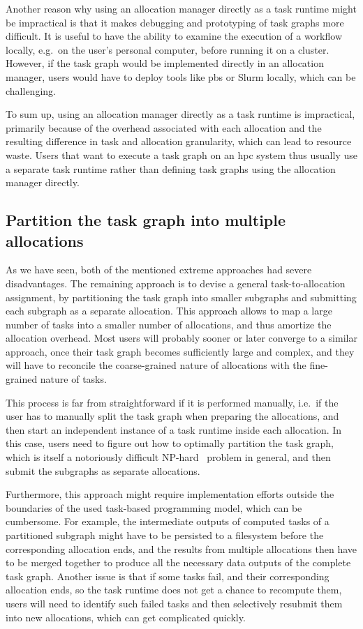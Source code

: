 Another reason why using an allocation manager directly as a task runtime might be impractical is
that it makes debugging and prototyping of task graphs more difficult. It is useful to have the
ability to examine the execution of a workflow locally, e.g.\ on the user's personal computer,
before running it on a cluster. However, if the task graph would be implemented directly in an
allocation manager, users would have to deploy tools like \gls{pbs} or Slurm
locally, which can be challenging.

To sum up, using an allocation manager directly as a task runtime is impractical, primarily because
of the overhead associated with each allocation and the resulting difference in task and allocation
granularity, which can lead to resource waste. Users that want to execute a task graph on an
\gls{hpc} system thus usually use a separate task runtime rather than defining
task graphs using the allocation manager directly.

\subsection*{Partition the task graph into multiple allocations}
As we have seen, both of the mentioned extreme approaches had severe disadvantages. The remaining
approach is to devise a general task-to-allocation assignment, by partitioning the task graph into
smaller subgraphs and submitting each subgraph as a separate allocation. This approach allows to
map a large number of tasks into a smaller number of allocations, and thus amortize the allocation
overhead. Most users will probably sooner or later converge to a similar approach, once their task
graph becomes sufficiently large and complex, and they will have to reconcile the coarse-grained
nature of allocations with the fine-grained nature of tasks.

This process is far from straightforward if it is performed manually, i.e.\ if the user has to
manually split the task graph when preparing the allocations, and then start an independent
instance of a task runtime inside each allocation. In this case, users need to figure out how to
optimally partition the task graph, which is itself a notoriously difficult
NP-hard~\cite{graph_partitioning} problem in general, and then submit the subgraphs as separate
allocations.

Furthermore, this approach might require implementation efforts outside the boundaries of the used
task-based programming model, which can be cumbersome. For example, the intermediate outputs of
computed tasks of a partitioned subgraph might have to be persisted to a filesystem before the
corresponding allocation ends, and the results from multiple allocations then have to be merged
together to produce all the necessary data outputs of the complete task graph. Another issue is
that if some tasks fail, and their corresponding allocation ends, so the task runtime does not get
a chance to recompute them, users will need to identify such failed tasks and then selectively
resubmit them into new allocations, which can get complicated quickly.

